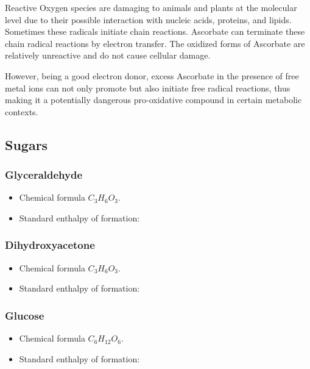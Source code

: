 \documentclass[a4paper,14pt]{extarticle}
\begin{document}
Reactive Oxygen species are damaging to animals and plants at the molecular level due to
their possible interaction with nucleic acids, proteins, and lipids. Sometimes these
radicals initiate chain reactions. Ascorbate can terminate these chain radical reactions
by electron transfer. The oxidized forms of Ascorbate are relatively unreactive and do not
cause cellular damage.

However, being a good electron donor, excess Ascorbate in the presence of free metal ions
can not only promote but also initiate free radical reactions, thus making it a
potentially dangerous pro-oxidative compound in certain metabolic contexts.

\subsection{Sugars}

\subsubsection{Glyceraldehyde}
\begin{itemize}
    \item Chemical formula $C_3H_6O_3$.
    \item Standard enthalpy of formation:
\end{itemize}

\subsubsection{Dihydroxyacetone}
\begin{itemize}
    \item Chemical formula $C_3H_6O_3$.
    \item Standard enthalpy of formation:
\end{itemize}

\subsubsection{Glucose}
\begin{itemize}
    \item Chemical formula $C_6H_{12}O_6$.
    \item Standard enthalpy of formation:
\end{itemize}
\end{document}
